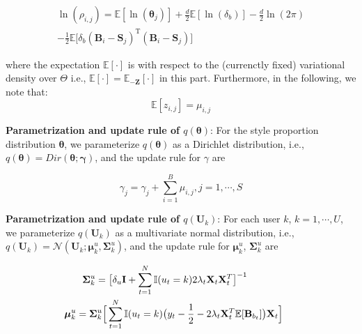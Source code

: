 
\begin{align}
\ln(\rho_{i,j}) =  \mathbb{E}[\ln(\bm{\theta}_j)]+\frac{d}{2}\mathbb{E}[\ln(\delta_b)]-\frac{d}{2}\ln(2\pi) \nonumber \\
 -\frac{1}{2}\mathbb{E}\big[\delta_b(\mathbf{B}_i-\mathbf{S}_j)^\mathrm{T}(\mathbf{B}_i-\mathbf{S}_j)\big]
\end{align}

\noindent where the expectation $\mathbb{E}[\cdot]$ is with respect to the (currenctly fixed) variational density over $\Theta$  i.e., $\mathbb{E}[\cdot]=\mathbb{E}_{-\bm{Z}}[\cdot]$ in this part. Furthermore, in the following, we note that: 
\begin{equation}
\label{eq:hidden}
\mathbb{E}[z_{i,j}]=\mu_{i,j}
\end{equation}

\noindent \textbf{Parametrization and update rule of $q(\mathbf{\theta})$}:
For the style proportion distribution $\mathbf{\theta}$, we parameterize $q(\mathbf{\theta})$ as a Dirichlet distribution, i.e., $q(\mathbf{\theta}) = Dir(\mathbf{\theta}; \mathbf{\gamma})$, and the update rule for $\gamma$ are 

\begin{equation}
\label{eq:start}
\gamma_j = \gamma_j + \sum_{i=1}^B \mu_{i,j}, j=1,\cdots,S
\end{equation}



\noindent \textbf{Parametrization and update rule of $q(\mathbf{U}_k)$}:
For each user $k$, $k = 1, \cdots, U$, we parameterize $q(\mathbf{U}_k)$ as a multivariate normal distribution, i.e., $q(\mathbf{U}_k) = \mathcal{N}(\mathbf{U}_k; \bm{\mu}^u_k, \bm{\Sigma}_k^u)$, and the update rule for $\bm{\mu}^u_k$, $\bm{\Sigma}_k^u$ are 

\begin{align}
\bm{\Sigma}_k^u = \big[  \delta_u \mathbf{I} + \sum_{t=1}^N \mathbb{I}(u_t = k) 2\lambda_t \mathbf{X}_t \mathbf{X}_t^T  \big]^{-1} ~~~~~~~~~~~\\ 
\hskip -0.5cm \bm{\mu}^u_k = \bm{\Sigma}_k^u\Big[  \sum_{t=1}^N\mathbb{I}(u_t=k)  \big(y_t-\frac{1}{2}-2\lambda_{t}\mathbf{X}_t^T\mathbb{E}[\mathbf{B}_{b_t}]\big)\mathbf{X}_t \Big]
\end{align}

